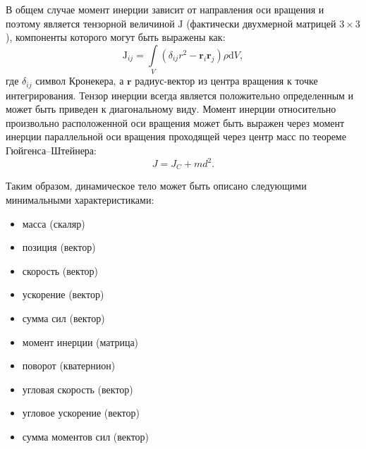 В общем случае момент инерции зависит от направления оси вращения и поэтому является тензорной
величиной $\mathrm{J}$ (фактически двухмерной матрицей \begin{math}3\times3\end{math}), компоненты которого могут
быть выражены как:
\begin{equation}
 \mathrm{J}_{ij} = \int\limits_{V} (\delta_{ij}r^2 - \mathbf{r}_i \mathbf{r}_j) \rho \mathrm{d}V,
\end{equation}
где $\delta_{ij}$ символ Кронекера, а $\mathbf{r}$ радиус-вектор из центра вращения к точке интегрирования.
Тензор инерции всегда является положительно определенным и может быть приведен к диагональному виду. Момент
инерции относительно произвольно расположенной оси вращения может быть выражен через момент инерции параллельной
оси вращения проходящей через центр масс по теореме Гюйгенса--Штейнера:
\begin{equation}
 J=J_C+md^2.
\end{equation}


Таким образом, динамическое тело может быть описано
следующими минимальными характеристиками:
\begin{itemize}
  \item масса (скаляр)
  \item позиция (вектор)
  \item скорость (вектор)
  \item ускорение (вектор) %
  \item сумма сил (вектор) %
  \item момент инерции (матрица)
  \item поворот (кватернион)
  \item угловая скорость (вектор)
  \item угловое ускорение (вектор) %
  \item сумма моментов сил (вектор) %
\end{itemize}

